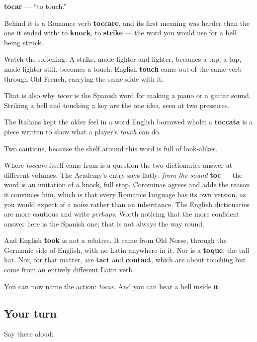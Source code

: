 \begin{cousinweb}
\textbf{tocar} — \textquotedblleft{}to touch.\textquotedblright{}

Behind it is a Romance verb \textbf{toccare}, and its first meaning was harder than the one it ended with: to \textbf{knock}, to \textbf{strike} — the word you would use for a bell being struck.

Watch the softening. A strike, made lighter and lighter, becomes a tap; a tap, made lighter still, becomes a touch. English \textbf{touch} came out of the same verb through Old French, carrying the same slide with it.

That is also why \emph{tocar} is the Spanish word for making a piano or a guitar sound. Striking a bell and touching a key are the one idea, seen at two pressures.

The Italians kept the older feel in a word English borrowed whole: a \textbf{toccata} is a piece written to show what a player's \emph{touch} can do.

Two cautions, because the shelf around this word is full of look-alikes.

Where \emph{toccare} itself came from is a question the two dictionaries answer at different volumes. The Academy's entry says flatly: \emph{from the sound} \textbf{toc} — the word is an imitation of a knock, full stop. Corominas agrees and adds the reason it convinces him, which is that every Romance language has its own version, as you would expect of a noise rather than an inheritance. The English dictionaries are more cautious and write \emph{perhaps}. Worth noticing that the more confident answer here is the Spanish one; that is not always the way round.

And English \textbf{took} is not a relative. It came from Old Norse, through the Germanic side of English, with no Latin anywhere in it. Nor is a \textbf{toque}, the tall hat. Nor, for that matter, are \textbf{tact} and \textbf{contact}, which are about touching but come from an entirely different Latin verb.
\end{cousinweb}

\begin{grammarlens}[title={What you've built}]
You can now name the action: \emph{tocar}. And you can hear a bell inside it.
\end{grammarlens}

\subsection*{Your turn}
Say these aloud:

